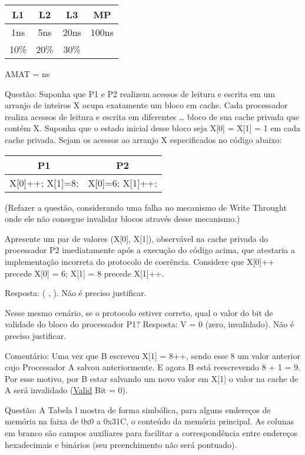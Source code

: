 \documentclass{article}
\begin{document}
\begin{tabular}{|c|c|c|c|}
\hline L1 & L2 & L3 & MP \\
\hline 1ns & 5ns & 20ns & 100ns \\
\hline 10\% & 20\% & 30\% & ~ \\
\hline
\end{tabular}

AMAT =    ns

Questão: Suponha que P1 e P2 realizem acessos de leitura e escrita em um
arranjo de inteiros X ocupa exatamente um bloco em cache. Cada processador
realiza acessos de leitura e escrita em diferentes … bloco de sua cache privada
que contém X. Suponha que o estado inicial desse bloco seja X[0] = X[1] = 1 em
cada cache privada. Sejam os acessos ao arranjo X especificados no código
abaixo:

\begin{tabular}{|c|c|}
\hline P1 & P2 \\
\hline X[0]++; X[1]=8; & X[0]=6; X[1]++; \\
\hline
\end{tabular}

(Refazer a questão, considerando uma falha no mecanismo de Write Throught onde
ele não consegue invalidar blocos através desse mecanismo.)

Apresente um par de valores (X[0], X[1]), observável na cache privada do
processador P2 imediatamente após a execução do código acima, que atestaria a
implementação incorreta do protocolo de coerência. Considere que X[0]++ precede
X[0] = 6; X[1] = 8 precede X[1]++.

Resposta: (    ,    ). Não é preciso justificar.

Nesse mesmo cenário, se o protocolo estiver correto, qual o valor do bit de
validade do bloco do processador P1? Resposta: V = 0 (zero, invalidado). Não é
preciso justificar.

Comentário: Uma vez que B escreveu X[1] = 8++, sendo esse 8 um valor anterior
cujo Processador A salvou anteriormente. E agora B está reescrevendo 8 + 1 = 9.
Por esse motivo, por B estar salvando um novo valor em X[1] o valor na cache de
A será invalidado (\underline{Valid} Bit = 0).

Questão: A Tabela l mostra de forma simbólica, para alguns endereços de memória
na faixa de 0x0 a 0x31C, o conteúdo da memória principal. As colunas em branco
são campos auxiliares para facilitar a correspondência entre endereços
hexadecimais e binários (seu preenchimento não será pontuado).
\end{document}
